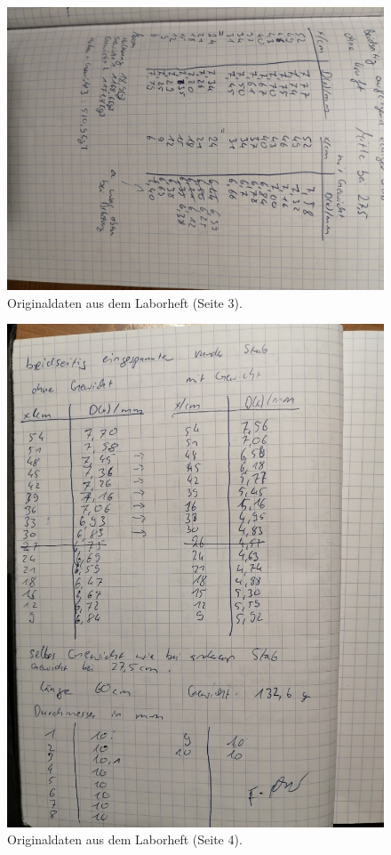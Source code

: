 \begin{figure}
    \centering
    \includegraphics[width=\textwidth,angle=90]{content/data/daten3.jpg}
    \caption{Originaldaten aus dem Laborheft (Seite 3).}
\end{figure}
\begin{figure}
    \centering
    \includegraphics[width=\textwidth]{content/data/daten4.jpg}
    \caption{Originaldaten aus dem Laborheft (Seite 4).}
\end{figure}